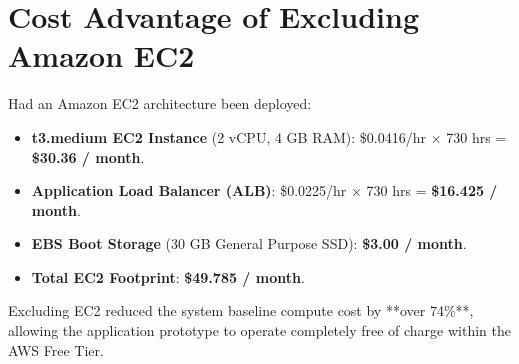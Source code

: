 \section{Cost Advantage of Excluding Amazon EC2}
Had an Amazon EC2 architecture been deployed:
\begin{itemize}
    \item \textbf{t3.medium EC2 Instance} (2 vCPU, 4 GB RAM): \$0.0416/hr $\times$ 730 hrs = \textbf{\$30.36 / month}.
    \item \textbf{Application Load Balancer (ALB)}: \$0.0225/hr $\times$ 730 hrs = \textbf{\$16.425 / month}.
    \item \textbf{EBS Boot Storage} (30 GB General Purpose SSD): \textbf{\$3.00 / month}.
    \item \textbf{Total EC2 Footprint}: \textbf{\$49.785 / month}.
\end{itemize}

Excluding EC2 reduced the system baseline compute cost by **over 74\%**, allowing the application prototype to operate completely free of charge within the AWS Free Tier.
